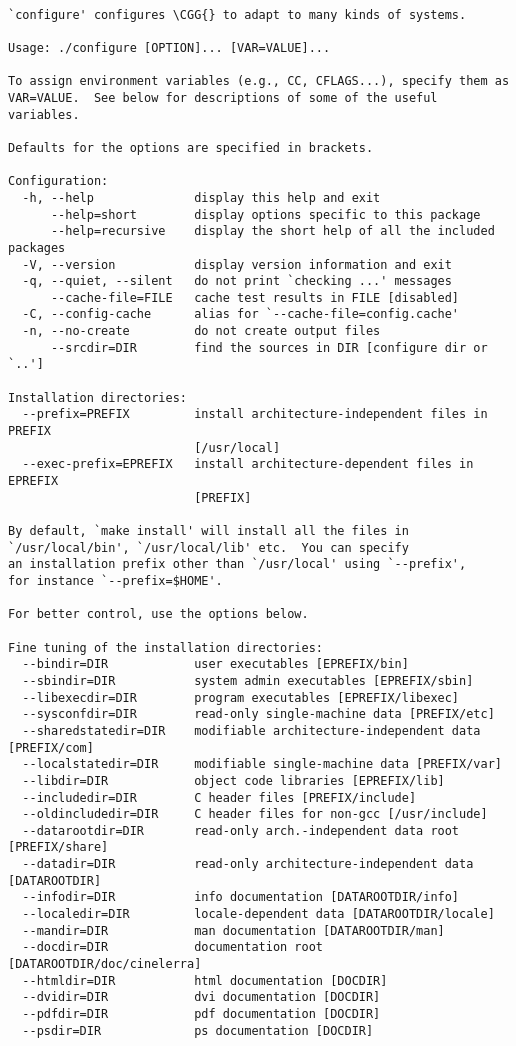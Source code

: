 \begingroup
    \fontsize{10pt}{12pt}\selectfont
\begin{verbatim}

`configure' configures \CGG{} to adapt to many kinds of systems.

Usage: ./configure [OPTION]... [VAR=VALUE]...

To assign environment variables (e.g., CC, CFLAGS...), specify them as
VAR=VALUE.  See below for descriptions of some of the useful variables.

Defaults for the options are specified in brackets.

Configuration:
  -h, --help              display this help and exit
      --help=short        display options specific to this package
      --help=recursive    display the short help of all the included packages
  -V, --version           display version information and exit
  -q, --quiet, --silent   do not print `checking ...' messages
      --cache-file=FILE   cache test results in FILE [disabled]
  -C, --config-cache      alias for `--cache-file=config.cache'
  -n, --no-create         do not create output files
      --srcdir=DIR        find the sources in DIR [configure dir or `..']

Installation directories:
  --prefix=PREFIX         install architecture-independent files in PREFIX
                          [/usr/local]
  --exec-prefix=EPREFIX   install architecture-dependent files in EPREFIX
                          [PREFIX]

By default, `make install' will install all the files in
`/usr/local/bin', `/usr/local/lib' etc.  You can specify
an installation prefix other than `/usr/local' using `--prefix',
for instance `--prefix=$HOME'.

For better control, use the options below.

Fine tuning of the installation directories:
  --bindir=DIR            user executables [EPREFIX/bin]
  --sbindir=DIR           system admin executables [EPREFIX/sbin]
  --libexecdir=DIR        program executables [EPREFIX/libexec]
  --sysconfdir=DIR        read-only single-machine data [PREFIX/etc]
  --sharedstatedir=DIR    modifiable architecture-independent data [PREFIX/com]
  --localstatedir=DIR     modifiable single-machine data [PREFIX/var]
  --libdir=DIR            object code libraries [EPREFIX/lib]
  --includedir=DIR        C header files [PREFIX/include]
  --oldincludedir=DIR     C header files for non-gcc [/usr/include]
  --datarootdir=DIR       read-only arch.-independent data root [PREFIX/share]
  --datadir=DIR           read-only architecture-independent data [DATAROOTDIR]
  --infodir=DIR           info documentation [DATAROOTDIR/info]
  --localedir=DIR         locale-dependent data [DATAROOTDIR/locale]
  --mandir=DIR            man documentation [DATAROOTDIR/man]
  --docdir=DIR            documentation root [DATAROOTDIR/doc/cinelerra]
  --htmldir=DIR           html documentation [DOCDIR]
  --dvidir=DIR            dvi documentation [DOCDIR]
  --pdfdir=DIR            pdf documentation [DOCDIR]
  --psdir=DIR             ps documentation [DOCDIR]


\end{verbatim}
